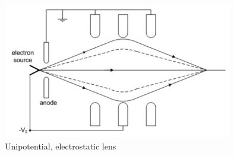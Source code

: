 \begin{figure}[!ht]
	\centering
	\includegraphics[width=10cm]{pictures/pictures_ch2/UnipotentialLens.png}
	\caption{Unipotential, electrostatic lens \cite[p.33]{EGERTON_2016}}
	\label{fig: unipotentialLens}
\end{figure}

\newpage